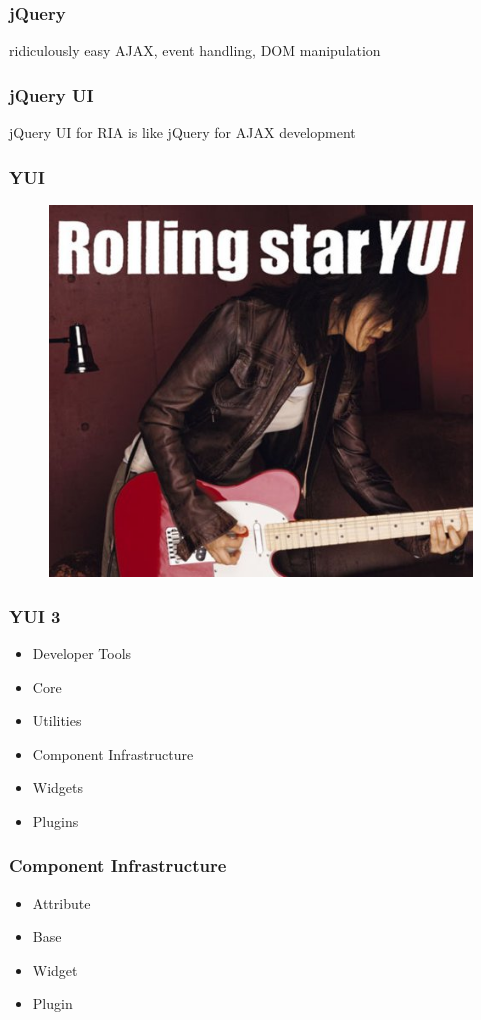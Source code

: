 \documentclass[16pt]{beamer}
\begin{document}
\begin{frame}
  \frametitle{jQuery}
  \begin{center}
    ridiculously easy AJAX, event handling, DOM manipulation
  \end{center}
\end{frame}

\begin{frame}
  \frametitle{jQuery UI}
  \begin{center}
    jQuery UI for RIA is like jQuery for AJAX development
  \end{center}
\end{frame}

\begin{frame}
  \frametitle{YUI}
  \begin{figure}
    \includegraphics[width=0.8\linewidth]{yui.jpg}
  \end{figure}
\end{frame}

\begin{frame}
  \frametitle{YUI 3}
  \begin{itemize}
  \item Developer Tools
  \item Core
  \item Utilities
  \item Component Infrastructure
  \item Widgets
  \item Plugins
  \end{itemize}
\end{frame}

\begin{frame}
  \frametitle{Component Infrastructure}
  \begin{itemize}
  \item Attribute
  \item Base
  \item Widget
  \item Plugin
  \end{itemize}
\end{frame}
\end{document}
